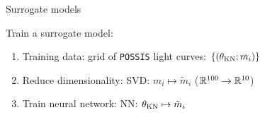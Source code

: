 \documentclass[usenames,dvipsnames,t]{beamer}
\begin{document}
\begin{frame}{Surrogate models}

  \def\x{3mm}
  \def\y{2mm}

  Train a surrogate model:
  \begin{enumerate}
    \item Training data: grid of \texttt{POSSIS} light curves: $\left\{ (\theta_{\rm KN}; m_i) \right\}$
    
    \vspace{\x}
    
    \item Reduce dimensionality: SVD: $m_i \mapsto \tilde{m}_i$ ($\mathbb{R}^{100} \to \mathbb{R}^{10}$)
    
    \vspace{\x}
    
    \item Train neural network: NN: $\theta_{\rm KN} \mapsto \tilde{m}_i$

  \end{enumerate}

  \vspace{\y}



\end{frame}
\end{document}
